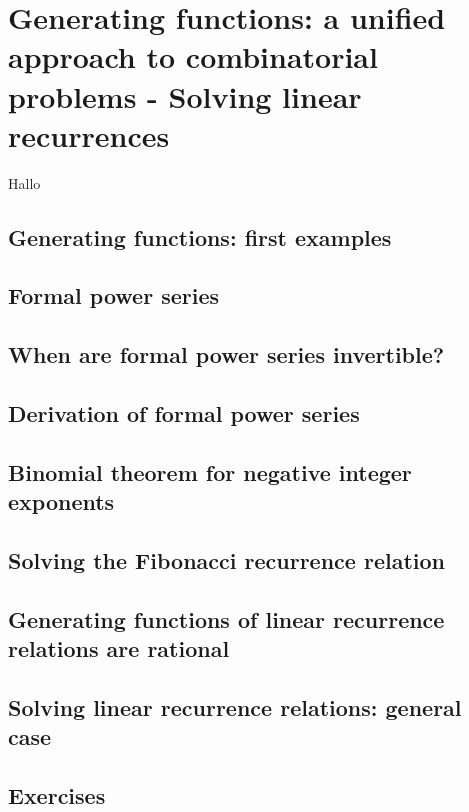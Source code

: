 \section{Generating functions: a unified approach to combinatorial problems - Solving linear recurrences}\label{generatingFunctions} 

Hallo

\subsection{Generating functions: first examples}

\subsection{Formal power series}

\subsection{When are formal power series invertible?}

\subsection{Derivation of formal power series}

\subsection{Binomial theorem for negative integer exponents}

\subsection{Solving the Fibonacci recurrence relation}

\subsection{Generating functions of linear recurrence relations are rational}

\subsection{Solving linear recurrence relations: general case}

\subsection{Exercises}